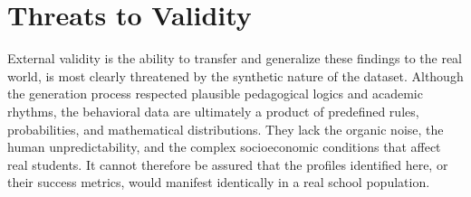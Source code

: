 \section{Threats to Validity}
\label{sec:threats-to-validity}
%
%
%
%

External validity is the ability to transfer and generalize these findings to the real world, is most clearly threatened by the synthetic nature of the dataset. Although the generation process respected plausible pedagogical logics and academic rhythms, the behavioral data are ultimately a product of predefined rules, probabilities, and mathematical distributions. They lack the organic noise, the human unpredictability, and the complex socioeconomic conditions that affect real students. It cannot therefore be assured that the profiles identified here, or their success metrics, would manifest identically in a real school population.

